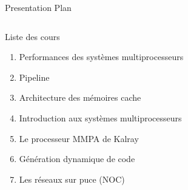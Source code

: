 %
\begin{Frame}{Presentation Plan}
  \begin{columns}[t]
    \begin{column}{8cm} %
      \begin{block}{Liste des cours}
        \begin{enumerate}
        \item  Performances des systèmes multiprocesseurs
        \item  Pipeline							
        \item  Architecture des mémoires cache	
        \item  Introduction aux systèmes multiprocesseurs
        \item  Le processeur MMPA de Kalray			
        \item  Génération dynamique de code			
        \item  Les réseaux sur puce  (NOC)
        \end{enumerate}
      \end{block} 
    \end{column}
    
  \end{columns}  
\end{Frame}


